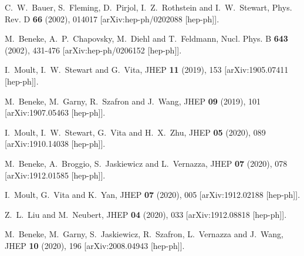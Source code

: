 \documentclass[12pt]{article}
\numberwithin{equation}{section}
\begin{document}
\begin{thebibliography}{99}

C.~W.~Bauer, S.~Fleming, D.~Pirjol, I.~Z.~Rothstein and I.~W.~Stewart,
Phys. Rev. D \textbf{66} (2002), 014017
[arXiv:hep-ph/0202088 [hep-ph]].

M.~Beneke, A.~P.~Chapovsky, M.~Diehl and T.~Feldmann,
Nucl. Phys. B \textbf{643} (2002), 431-476
[arXiv:hep-ph/0206152 [hep-ph]].

I.~Moult, I.~W.~Stewart and G.~Vita,
JHEP \textbf{11} (2019), 153
[arXiv:1905.07411 [hep-ph]].

M.~Beneke, M.~Garny, R.~Szafron and J.~Wang,
JHEP \textbf{09} (2019), 101
[arXiv:1907.05463 [hep-ph]].

I.~Moult, I.~W.~Stewart, G.~Vita and H.~X.~Zhu,
JHEP \textbf{05} (2020), 089
[arXiv:1910.14038 [hep-ph]].

M.~Beneke, A.~Broggio, S.~Jaskiewicz and L.~Vernazza,
JHEP \textbf{07} (2020), 078
[arXiv:1912.01585 [hep-ph]].

I.~Moult, G.~Vita and K.~Yan,
JHEP \textbf{07} (2020), 005
[arXiv:1912.02188 [hep-ph]].

Z.~L.~Liu and M.~Neubert,
JHEP \textbf{04} (2020), 033
[arXiv:1912.08818 [hep-ph]].

M.~Beneke, M.~Garny, S.~Jaskiewicz, R.~Szafron, L.~Vernazza and J.~Wang,
JHEP \textbf{10} (2020), 196
[arXiv:2008.04943 [hep-ph]].


\end{thebibliography}
\end{document}
